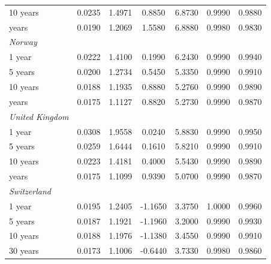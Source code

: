 \documentclass[12pt,bibliography=totoc]{article}
\begin{document}
\begin{appendices}
\begin{table}[H]
\begin{tabular}{l c c c c c c}
10 years	&	0.0235	&	1.4971	&	0.8850	&	6.8730	&	0.9990	&	0.9880	\\
\medskip													
30 years	&	0.0190	&	1.2069	&	1.5580	&	6.8880	&	0.9980	&	0.9830	\\
\textit{Norway}	&		&		&		&		&		&		\\
1 year	&	0.0222	&	1.4100	&	0.1990	&	6.2430	&	0.9990	&	0.9940	\\
5 years	&	0.0200	&	1.2734	&	0.5450	&	5.3350	&	0.9990	&	0.9910	\\
10 years	&	0.0188	&	1.1935	&	0.8880	&	5.2760	&	0.9990	&	0.9890	\\
\medskip													
30 years	&	0.0175	&	1.1127	&	0.8820	&	5.2730	&	0.9990	&	0.9870	\\
\textit{United Kingdom}	&		&		&		&		&		&		\\
1 year	&	0.0308	&	1.9558	&	0.0240	&	5.8830	&	0.9990	&	0.9950	\\
5 years	&	0.0259	&	1.6444	&	0.1610	&	5.8210	&	0.9990	&	0.9910	\\
10 years	&	0.0223	&	1.4181	&	0.4000	&	5.5430	&	0.9990	&	0.9890	\\
\medskip													
30 years	&	0.0175	&	1.1099	&	0.9390	&	5.0700	&	0.9990	&	0.9870	\\
\textit{Switzerland}	&		&		&		&		&		&		\\
1 year	&	0.0195	&	1.2405	&	-1.1650	&	3.3750	&	1.0000	&	0.9960	\\
5 years	&	0.0187	&	1.1921	&	-1.1960	&	3.2000	&	0.9990	&	0.9930	\\
10 years	&	0.0188	&	1.1976	&	-1.1380	&	3.4550	&	0.9990	&	0.9910	\\
30 years	&	0.0173	&	1.1006	&	-0.6440	&	3.7330	&	0.9980	&	0.9860	\\

\hline%
\end{tabular}
\label{table:nonlin}%
\end{table}




\end{appendices}
\end{document}
